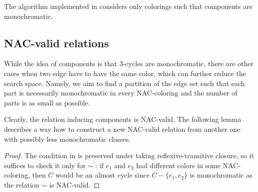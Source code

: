 The algorithm implemented in \flexrilog{}
considers only colorings such that \trcon{} components are monochromatic.

\subsection{NAC-valid relations}%
\label{sec:NACvalid}

While the idea of \trcon{} components is that 3-cycles are monochromatic,
there are other cases when two edge have to have the same color, which can further reduce the search space.
Namely, we aim to find a partition of the edge set such that each part is necessarily monochromatic
in every NAC-coloring and the number of parts is as small as possible.


Clearly, the relation inducing \trcon{} components is NAC-valid.
The following lemma describes a way how to construct a new NAC-valid relation from another one
with possibly less monochromatic classes.

\begin{proof}
	The condition in  is preserved under taking reflexive-transitive closure,
	so it suffices to check it only for $\sim^\prime$: if $e_1$ and $e_2$ had different colors in some NAC-coloring,
	then $C$ would be an almost cycle since $C - \{e_1,e_2\}$ is monochromatic as the relation $\sim$ is NAC-valid.
\end{proof}

